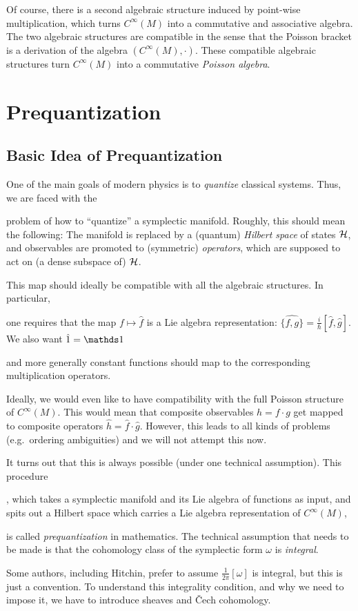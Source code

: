 \documentclass[parskip=half]{scrartcl}
\begin{document}
Of course, there is a second algebraic structure induced by point-wise multiplication, which turns $C^\infty(M)$ into a commutative and associative algebra. The two algebraic structures are compatible in the sense that the Poisson bracket is a derivation of the algebra $(C^\infty(M),\cdot)$. These compatible algebraic structures turn $C^\infty(M)$ into a commutative \emph{Poisson algebra}.

\section{Prequantization}

\subsection{Basic Idea of Prequantization}

One of the main goals of modern physics is to \emph{quantize} classical systems. Thus, we are faced with the 
\begin{onboard}
	problem of how to ``quantize'' a symplectic manifold. Roughly, this should mean the following: The manifold is replaced by a (quantum) \emph{Hilbert space} of states $\mathcal{H}$, and observables are promoted to (symmetric) \emph{operators}, which are supposed to act on (a dense subspace of) $\mathcal{H}$.
\end{onboard}
This map should ideally be compatible with all the algebraic structures. In particular, 
\begin{onboard}
	one requires that the map $f\mapsto \hat f$ is a Lie algebra representation: $\widehat{\{f,g\}}=\frac{i}{\hbar}[\hat f,\hat g]$. We also want $\hat 1=\Unit$
\end{onboard}
and more generally constant functions should map to the corresponding multiplication operators.

Ideally, we would even like to have compatibility with the full Poisson structure of $C^\infty(M)$. This would mean that composite observables $h=f\cdot g$ get mapped to composite operators $\hat h=\hat f \cdot \hat g$. However, this leads to all kinds of problems (e.g.~ordering ambiguities) and we will not attempt this now.

\begin{onboard}
It turns out that this is always possible (under one technical assumption). This procedure
\end{onboard}
, which takes a symplectic manifold and its Lie algebra of functions as input, and spits out a Hilbert space which carries a Lie algebra representation of $C^\infty(M)$,
\begin{onboard}
 is called \emph{prequantization} in mathematics. The technical assumption that needs to be made is that the cohomology class of the symplectic form $\omega$ is \emph{integral}.
\end{onboard}
Some authors, including Hitchin, prefer to assume $\frac{1}{2\pi}[\omega]$ is integral, but this is just a convention. To understand this integrality condition, and why we need to impose it, we have to introduce sheaves and \v{C}ech cohomology.
\end{document}

